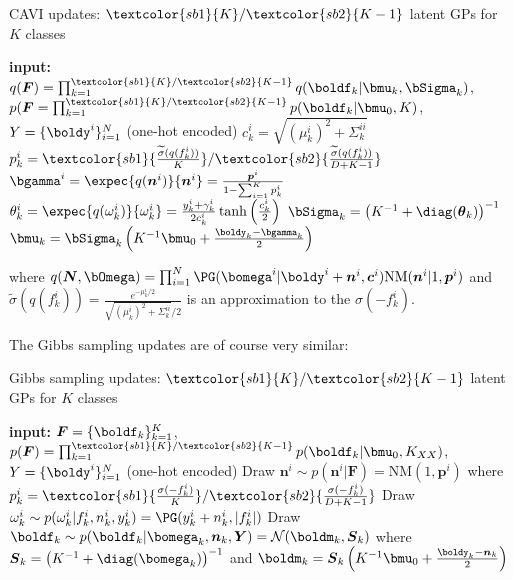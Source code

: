 \begin{algorithm}[H]
    \caption{\ac{CAVI} updates: $\textcolor{sb1}{K}/\textcolor{sb2}{K - 1}$ latent \ac{GPs} for $K$ classes}
    \begin{algorithmic}
    \State \textbf{input:} $q(\boldsymbol{F}) = \prod_{k=1}^{\textcolor{sb1}{K}/\textcolor{sb2}{K - 1}} q(\boldf_k|\bmu_k, \bSigma_k)$, $p(\boldsymbol{F} = \prod_{k=1}^{\textcolor{sb1}{K}/\textcolor{sb2}{K - 1}} p(\boldf_k|\bmu_0, K)$, $Y=\{\boldy^i\}_{i=1}^N$ (one-hot encoded)
        \State $c^i_k = \sqrt{(\mu^i_k)^2 + \Sigma_k^{ii}}$
        \State $p^i_k = \textcolor{sb1}{\frac{\widetilde{\sigma}(q(f_k^i))}{K}}/\textcolor{sb2}{\frac{\widetilde{\sigma}(q(f_k^i))}{D + K - 1}}$
        \State $\bgamma^i = \expec{q(\boldsymbol{n}^i)}{\boldsymbol{n}^i} = \frac{\boldsymbol{p}^i}{1 - \sum_{i=1}^K p^i_k}$
        \State $\theta_k^i = \expec{q(\omega_k^i)}{\omega_k^i} = \frac{y_k^i + \gamma_k^i}{2c_k^i}\tanh\left(\frac{c_k^i}{2}\right)$
        \State $\bSigma_k = \left(K^{-1} + \diag(\boldsymbol{\theta}_k)\right)^{-1}$
        \State $\bmu_k = \bSigma_k\left(K^{-1}\bmu_0 + \frac{\boldy_k - \bgamma_k}{2}\right)$
    \EndWhile
    \end{algorithmic}
    where $q(\boldsymbol{N}, \bOmega) = \prod_{i=1}^N \PG(\bomega^i|\boldy^i + \boldsymbol{n}^i, \boldsymbol{c}^i)\mathrm{NM}(\boldsymbol{n}^i|1, \boldsymbol{p}^i)$ and $\widetilde{\sigma}(q(f_k^i)) = \frac{e^{-\mu_k^i/2}}{\sqrt{(\mu_k^i)^2 + \Sigma^{ii}_k} / 2}$ is an approximation to the $\sigma(-f^i_k)$.
    \label{alg:cavi_multiclass}
\end{algorithm}

The Gibbs sampling updates are of course very similar:
\begin{algorithm}[H]
    \caption{Gibbs sampling updates: $\textcolor{sb1}{K}/\textcolor{sb2}{K - 1}$ latent \ac{GPs} for $K$ classes}
    \begin{algorithmic}
    \State \textbf{input:} $\boldsymbol{F} = \{\boldf_k\}_{k=1}^K$, $p(\boldsymbol{F}) = \prod_{k=1}^{\textcolor{sb1}{K}/\textcolor{sb2}{K - 1}} p(\boldf_k|\bmu_0, K_{XX})$, $Y=\{\boldy^i\}_{i=1}^N$ (one-hot encoded)
        \State Draw $\boldsymbol{n}^i \sim p(\boldsymbol{n}^i|\boldsymbol{F}) = \mathrm{NM}(1, \boldsymbol{p}^i)$ where 
        $p_k^i = \textcolor{sb1}{\frac{\sigma(-f_k^i)}{K}}/\textcolor{sb2}{\frac{\sigma(-f_k^i)}{D + K - 1}}$
        \State Draw $\omega_k^i \sim p(\omega_k^i|f_k^i, n_k^i, y_k^i) = \PG(y_k^i + n^i_k, |f_k^i|)$
        \State Draw $\boldf_k \sim p(\boldf_k|\bomega_k,\boldsymbol{n}_k, \boldsymbol{Y}) = \mathcal{N}(\boldm_k, \boldsymbol{S}_k)$
        \State where $\boldsymbol{S}_k = \left(K^{-1} + \diag(\bomega_k)\right)^{-1}$ and $\boldm_k = \boldsymbol{S}_k\left(K^{-1}\bmu_0 + \frac{\boldy_k - \boldsymbol{n}_k}{2}\right)$
    \EndFor
    \end{algorithmic}
    \label{alg:gibbs_multiclass}
\end{algorithm}

